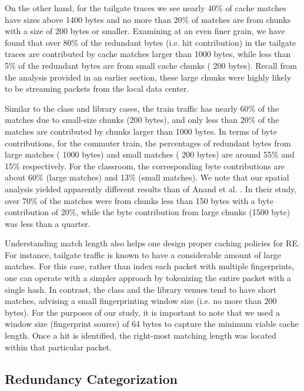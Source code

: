 \documentclass{sig-alternate}
\begin{document}
On the other hand, for the tailgate traces we see nearly 40\% of cache matches have sizes above 1400 bytes and no more than 20\% of matches are from chunks with a size of 200 bytes or smaller. Examining at an even finer grain, we have found that over 80\% of the redundant bytes (i.e. hit contribution) in the tailgate traces are contributed by cache matches larger than 1000 bytes, while less than 5\% of the redundant bytes are from small cache chunks ( 200 bytes). Recall from the analysis provided in an earlier section, these large chunks were highly likely to be streaming packets from the local data center.  

Similar to the class and library cases, the train traffic has nearly 60\% of the matches due to small-size chunks (200 bytes), and only less than 20\% of the matches are contributed by chunks larger than 1000 bytes. In terms of byte contributions, for the commuter train, the percentages of redundant bytes from large matches ( 1000 bytes) and small matches ( 200 bytes) are around 55\% and 15\% respectively. For the classroom, the corresponding byte contributions are about 60\% (large matches) and 13\% (small matches). We note that our spatial analysis yielded apparently different results than of Anand et al. \cite{Anand:2009}. In their study, over 70\% of the matches were from chunks less than 150 bytes with a byte contribution of 20\%, while the byte contribution from large chunks (1500 byte) was less than a quarter.  

Understanding match length also helps one design proper caching policies for RE. For instance, tailgate traffic is known to have a considerable amount of large matches. For this case, rather than index each packet with multiple fingerprints, one can operate with a simpler approach by tokenizing the entire packet with a single hash. In contrast, the class and the library venues tend to have short matches, advising a small fingerprinting window size (i.e. no more than 200 bytes). For the purposes of our study, it is important to note that we used a window size (fingerprint source) of 64 bytes to capture the minimum viable cache length. Once a hit is identified, the right-most matching length was located within that particular packet.   


\subsection{Redundancy Categorization}
\end{document}
